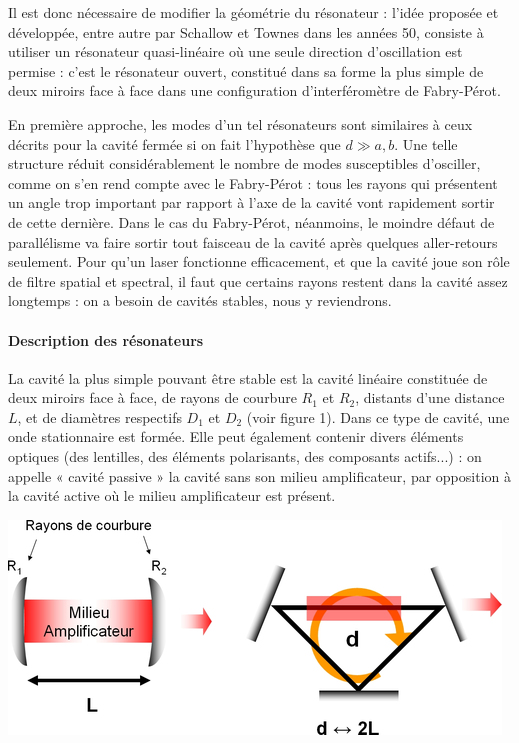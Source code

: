 \documentclass{book}
\begin{document}
Il est donc nécessaire de modifier la géométrie du résonateur : l'idée proposée et développée, entre autre par Schallow et Townes dans les années 50, consiste à utiliser un résonateur quasi-linéaire où une seule direction d'oscillation est permise : c'est le résonateur ouvert, constitué dans sa forme la plus simple de deux miroirs face à face dans une configuration d'interféromètre de Fabry-Pérot.

En première approche, les modes d'un tel résonateurs sont similaires à ceux décrits pour la cavité fermée si on fait l'hypothèse que $d\gg a, b$. Une telle structure réduit considérablement le nombre de modes susceptibles d'osciller, comme on s'en rend compte avec le Fabry-Pérot : tous les rayons qui présentent un angle trop important par rapport à l'axe de la cavité vont rapidement sortir de cette dernière. Dans le cas du Fabry-Pérot, néanmoins, le moindre défaut de parallélisme va faire sortir tout faisceau de la cavité après quelques aller-retours seulement. Pour qu'un laser fonctionne efficacement, et que la cavité joue son rôle de filtre spatial et spectral, il faut que certains rayons restent dans la cavité assez longtemps : on a besoin de cavités stables, nous y reviendrons.

\paragraph{Description des résonateurs}

La cavité la plus simple pouvant être stable est la cavité linéaire constituée de deux miroirs face à face, de rayons de courbure $R_1$ et $R_2$, distants d'une distance $L$, et de diamètres respectifs $D_1$ et $D_2$ (voir figure 1). Dans ce type de cavité, une onde stationnaire est formée. Elle peut également contenir divers éléments optiques (des lentilles, des éléments polarisants, des composants actifs...) : on appelle « cavité passive » la cavité sans son milieu amplificateur, par opposition à la cavité active où le milieu amplificateur est présent.

{\centering
\includegraphics[scale=1.7]{images/fig01.jpg}
\par}
\end{document}
